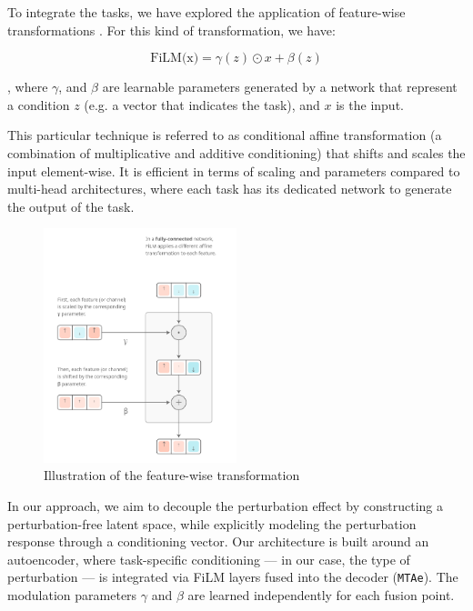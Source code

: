 \documentclass[12pt, a4paper]{article}
\begin{document}

To integrate the tasks, we have explored the application of feature-wise transformations \cite{dumoulin2018feature-wise}. For this kind of transformation, we have:

\[ \text{FiLM(x)} = \gamma (z) \odot x + \beta (z) \]

, where $\gamma$, and $\beta$ are learnable parameters generated by a network that represent a condition $z$ (e.g. a vector that indicates the task), and $x$ is the input.

This particular technique is referred to as conditional affine transformation (a combination of multiplicative and additive conditioning) that shifts and scales the input element-wise. It is efficient in terms of scaling and parameters compared to multi-head architectures, where each task has its dedicated network to generate the output of the task.


\begin{figure}[h!]
    \centering
    \includegraphics[width=0.5\textwidth]{film_layers.png}
    \caption{Illustration of the feature-wise transformation \cite{dumoulin2018feature-wise}}
    \label{fig:film}
\end{figure}

In our approach, we aim to decouple the perturbation effect by constructing a perturbation-free latent space, while explicitly modeling the perturbation response through a conditioning vector. Our architecture is built around an autoencoder, where task-specific conditioning — in our case, the type of perturbation — is integrated via FiLM layers fused into the decoder (\verb|MTAe|). The modulation parameters $\gamma$ and $\beta$ are learned independently for each fusion point.
\end{document}
